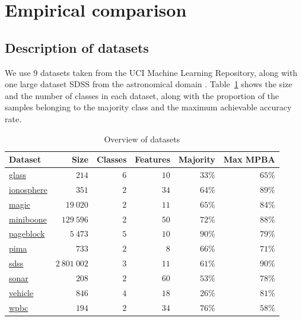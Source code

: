 \documentclass[fleqn,10pt,lineno]{wlpeerj} %
\begin{document}
\section*{Empirical comparison}

\subsection*{Description of datasets}

We use 9 datasets taken from the UCI Machine Learning Repository, along
with one large dataset SDSS from the astronomical domain \citep{alam15}.
Table~\ref{tab:datasets} shows the size and the number of classes in each
dataset, along with the proportion of the samples belonging to the majority
class and the maximum achievable accuracy rate.

\begin{table}[h]
	\caption {Overview of datasets} \label{tab:datasets}
	\centering
	\begin{tabular}{lrrrrr}
		\toprule
		{Dataset}  & Size &  Classes & Features & Majority & Max MPBA \\
		\midrule
        \href{https://archive.ics.uci.edu/ml/datasets/Glass+Identification}{glass}
        	& $214$ & $6$ & $10$ & $33\%$ & $65\%$ \\
		\href{https://archive.ics.uci.edu/ml/datasets/Ionosphere}{ionosphere}
        	& $351$ & $2$ & $34$ & $64\%$ & $89\%$ \\
        \href{https://archive.ics.uci.edu/ml/datasets/MAGIC+Gamma+Telescope}{magic}
        	& $19~020$ & $2$ & $11$ & $65\%$ & $84\%$ \\
        \href{https://archive.ics.uci.edu/ml/datasets/MiniBooNE+particle+identification}{miniboone}
        	& $129~596$ & $2$ & $50$ & $72\%$ & $88\%$ \\
        \href{https://archive.ics.uci.edu/ml/datasets/Page+Blocks+Classification}{pageblock}
        	& $5~473$ & $5$ & $10$ & $90\%$ & $79\%$ \\
		\href{https://archive.ics.uci.edu/ml/datasets/Pima+Indians+Diabetes}{pima}
        	& $733$ & $2$ & $8$ & $66\%$ & $71\%$ \\
        \href{http://dx.doi.org/10.5281/zenodo.58500}{sdss}
        	& $2~801~002$ & $3$ & $11$ & $61\%$ & $90\%$ \\
		\href{https://archive.ics.uci.edu/ml/datasets/Connectionist+Bench+(Sonar,+Mines+vs.+Rocks)}{sonar}
        	& $208$ & $2$ & $60$ & $53\%$ & $78\%$ \\
        \href{https://archive.ics.uci.edu/ml/datasets/Statlog+(Vehicle+Silhouettes)}{vehicle}
        	& $846$ & $4$ & $18$ & $26\%$ & $81\%$ \\
		\href{https://archive.ics.uci.edu/ml/datasets/Breast+Cancer+Wisconsin+(Prognostic)}{wpbc}
        	& $194$ & $2$ & $34$ & $76\%$ & $58\%$ \\
		\bottomrule
	\end{tabular}
\end{table}
\end{document}
